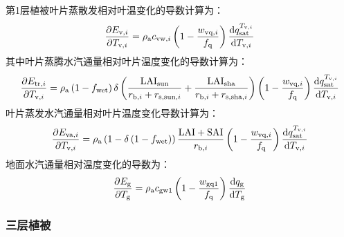 %
第1层植被叶片蒸散发相对叶温变化的导数计算为：
\begin{equation}
  \frac{\partial E_{\mathrm{v},i}}{\partial T_{\mathrm{v},i}} = \rho_{\mathrm{a}}c_{\mathrm{vw},i}\left( 1 - \frac{w_{\mathrm{vq},i}}{f_{\mathrm{q}}} \right)\frac{{\rm d}q_{\mathrm{sat}}^{T_{\mathrm{v},i}}}{{\rm d}T_{\mathrm{v},i}}
\end{equation}
%
其中叶片蒸腾水汽通量相对叶片温度变化的导数计算为：
\begin{equation}
  \frac{\partial E_{\mathrm{tr},i}}{\partial T_{\mathrm{v},i}} = \rho_{\mathrm{a}}\left( 1 - f_{\mathrm{wet}} \right)\delta\left( \frac{\text{LAI}_{\mathrm{sun}}}{r_{\mathrm{b},i} + r_{\mathrm{s},\mathrm{sun},i}} + \frac{\text{LAI}_{\mathrm{sha}}}{r_{\mathrm{b},i} + r_{\mathrm{s,sha},i}} \right)\left( 1 - \frac{w_{\mathrm{vq},i}}{f_{\mathrm{q}}} \right)\frac{{\rm d}q_{\mathrm{sat}}^{T_{\mathrm{v},i}}}{{\rm d}T_{\mathrm{v},i}}
\end{equation}
%
叶片蒸发水汽通量相对叶片温度变化导数计算为：
\begin{equation}
  \frac{\partial E_{\mathrm{va},i}}{\partial T_{\mathrm{v},i}} = \rho_{\mathrm{a}}\left( 1 - \delta\left( 1 - f_{\mathrm{wet}} \right) \right)\frac{\text{LAI} + \text{SAI}}{r_{\mathrm{b},i}}\left( 1 - \frac{w_{\mathrm{vq},i}}{f_{\mathrm{q}}} \right)\frac{{\rm d}q_{\mathrm{sat}}^{T_{\mathrm{v},i}}}{{\rm d}T_{\mathrm{v},i}}
\end{equation}
%
地面水汽通量相对温度变化的导数为：
\begin{equation}
  \frac{\partial E_{\mathrm{g}}}{\partial T_{\mathrm{g}}} = \rho_{\mathrm{a}}c_{\mathrm{gw1}}\left( 1 - \frac{w_{\mathrm{gq1}}}{f_{\mathrm {q}}} \right)\frac{{\rm d}q_{\mathrm{g}}}{{\rm d}T_{\mathrm{g}}}
\end{equation}

\subsubsection{三层植被}

